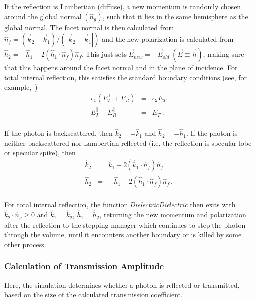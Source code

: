 If the reflection is Lambertian (diffuse), a new momentum is randomly
chosen around the global normal $(\hat{n}_g)$, such that it lies in
the same hemisphere as the global normal. The facet normal is then
calculated from $\hat{n}_f = (\vec{k}_2 - \vec{k}_1)/(|\vec{k}_2 -
\vec{k}_1|)$ and the new polarization is calculated from $\hat{h}_2 =
-\hat{h}_1 + 2(\hat{h}_1\cdot\hat{n}_f)\hat{n}_f$.  This just sets
$\vec{E}_{new} = -\vec{E}_{old}$ $(\vec{E} \equiv \vec{h})$, making
sure that this happens around the facet normal and in the plane of
incidence. For total internal reflection, this satisfies the standard 
boundary conditions (see, for example,~\cite{bb:JACKSON,bb:HECHT})
\begin{eqnarray}
  \epsilon_1\left(E^{\perp}_{I} + E^{\perp}_{R}\right) &=& \epsilon_2 E^{\perp}_{T}  \nonumber \\
                             E^{\parallel}_{I} + E^{\parallel}_{R} &=& E^{\parallel}_{T}~. \nonumber \\ \nonumber
\end{eqnarray}

If the photon is backscattered, then $\hat{k}_2 = -\hat{k}_1$ and
$\hat{h}_2 = -\hat{h}_1$. If the photon is neither backscattered nor
Lambertian reflected (i.e. the reflection is specular lobe or specular
spike), then
\begin{eqnarray}
  \hat{k}_2 &=&  \hat{k}_1 - 2(\hat{k}_1\cdot\hat{n}_f)\hat{n}_f  \nonumber \\
  \hat{h}_2 &=& -\hat{h}_1 + 2(\hat{h}_1\cdot\hat{n}_f)\hat{n}_f~. \nonumber \\ \nonumber
\end{eqnarray}

For total internal reflection, the function {\em DielectricDielectric} then
exits with $\hat{k}_2\cdot\hat{n}_g \geq 0$ and $\hat{k}_1 = \hat{k}_2$,
$\hat{h}_1 = \hat{h}_2$, returning the new momentum and polarization after
the reflection to the stepping manager which continues to step the photon
through the volume, until it encounters another boundary or is killed by
some other process.

\subsubsection{Calculation of Transmission Amplitude}

Here, the simulation determines whether a photon is reflected or
transmitted, based on the size of the calculated transmission
coefficient.

